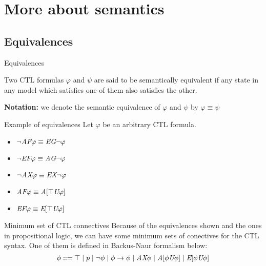 \section{More about semantics}
\subsection{Equivalences}

\begin{frame}{Equivalences}
	\begin{definition}
		Two CTL formulas $\varphi$ and $\psi$ are said to be \alert{semantically	equivalent} if any state in any model which satisfies one of them also satisfies the other.
	\end{definition}\pause
	\textbf{Notation:} we denote the semantic equivalence of $\varphi$ and $\psi$ by $\varphi \equiv \psi$
\end{frame}

\begin{frame}{Example of equivalences}
    Let $\varphi$ be an arbitrary CTL formula.
        
    \begin{itemize}
        \item
        {
            $\neg \textit{A}\textit{F} \varphi \equiv \textit{E}\textit{G} \neg \varphi $    
            \pause
        }
        \item
        {
            $\neg \textit{E}\textit{F} \varphi \equiv \textit{A}\textit{G} \neg \varphi$    
            \pause    
        }
        \item
        {
            $\neg \textit{A}\textit{X} \varphi \equiv \textit{E}\textit{X} \neg \varphi$    
            \pause
        }
        \item
        {
            $\textit{A}\textit{F}\varphi \equiv \textit{A}[\top \textit{U}\varphi]$    
            \pause
        }
        \item
        {
            $\textit{E}\textit{F} \varphi \equiv \textit{E}[\top \textit{U}\varphi]$
        }
    \end{itemize}
\end{frame}

\begin{frame}{Minimum set of CTL connectives}
    Because of the equivalences shown and the ones in propositional logic, we can have some minimum sets of conectives for the CTL syntax. One of them is defined in Backus-Naur formalism below:
    $$\phi ::=  \top \; | \; p \; | \; \neg \phi \; | \; \phi \to \phi \; | \; \textit{A}\textit{X} \phi \; | \;  \textit{A}[\phi\textit{U}\phi] \; | \; \textit{E}[\phi\textit{U}\phi]$$
\end{frame}